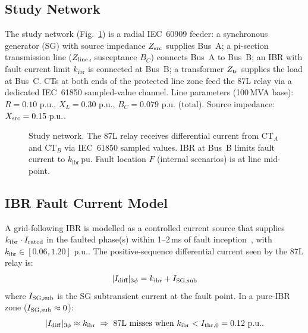 \documentclass[journal,twoside,10pt]{IEEEtran}
\newcommand{\Idiff}{I_{\mathrm{diff}}}
\newcommand{\kibr}{k_{\mathrm{ibr}}}
\newcommand{\pu}{\,\text{p.u.}}
\begin{document}
\subsection{Study Network}
\label{sec:network}

The study network (Fig.~\ref{fig:system}) is a radial IEC~60909 feeder:
a synchronous generator (SG) with source impedance $Z_{\rm src}$ supplies
Bus~A; a pi-section transmission line ($Z_{\rm line}$, susceptance $B_C$)
connects Bus~A to Bus~B; an IBR with fault current limit $\kibr$ is connected
at Bus~B; a transformer $Z_{\rm tr}$ supplies the load at Bus~C.
CTs at both ends of the protected line zone feed the 87L relay via a
dedicated IEC~61850 sampled-value channel.
Line parameters (100\,MVA base): $R = 0.10\,\pu$, $X_L = 0.30\,\pu$,
$B_C = 0.079\,\pu$ (total).  Source impedance: $X_{\rm src} = 0.15\,\pu$.

\begin{figure}[!t]
  \centering
  
  \caption{Study network.  The 87L relay receives differential current
           from CT$_A$ and CT$_B$ via IEC~61850 sampled values.
           IBR at Bus~B limits fault current to $\kibr$\,pu.
           Fault location $F$ (internal scenarios) is at line mid-point.}
  \label{fig:system}
\end{figure}

\subsection{IBR Fault Current Model}
\label{sec:ibrmodel}

A grid-following IBR is modelled as a controlled current source that supplies
$\kibr \cdot I_{\rm rated}$ in the faulted phase(s) within 1--2\,ms of fault
inception~\cite{Plet2011,Guo2021}, with $\kibr \in [0.06, 1.20]\,\pu$.
The positive-sequence differential current seen by the 87L relay is:
\begin{equation}
  |\Idiff|_{3\phi} = \kibr + I_{\rm SG,sub}
  \label{eq:diff3ph}
\end{equation}
where $I_{\rm SG,sub}$ is the SG subtransient current at the fault point.
In a pure-IBR zone ($I_{\rm SG,sub} \approx 0$):
\begin{equation}
  |\Idiff|_{3\phi} \approx \kibr
  \;\Rightarrow\;
  \text{87L misses when } \kibr < I_{\rm thr,0} = 0.12\,\pu.
  \label{eq:failure}
\end{equation}
\end{document}
